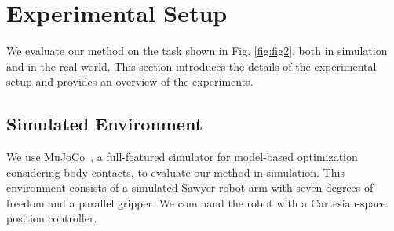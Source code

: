 \section{Experimental Setup}\label{sec:experiments}

We evaluate our method on the task shown in Fig. \ref{fig:fig2}, both in simulation and in the real world. This section introduces the details of the experimental setup and provides an overview of the experiments.

\subsection{Simulated Environment}
We use MuJoCo~\cite{todorov12mujoco}, a full-featured simulator for model-based optimization considering body contacts, to evaluate our method in simulation.
This environment consists of a simulated Sawyer robot arm with seven degrees of freedom and a parallel gripper. 
We command the robot with a Cartesian-space position controller.



